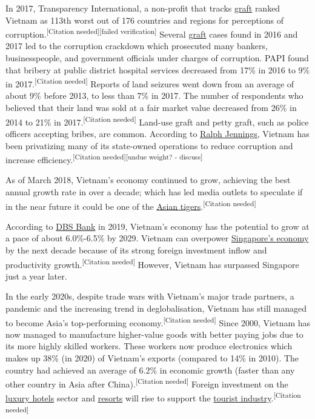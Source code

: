 \documentclass[openany]{book}
\begin{document}
In 2017, Transparency International, a non-profit that tracks \href{https://en.wikipedia.org/wiki/Graft_(politics)}{graft} ranked Vietnam as 113th worst out of 176 countries and regions for perceptions of corruption.\textsuperscript{[Citation needed][failed verification]} Several \href{https://en.wikipedia.org/wiki/Graft_(politics)}{graft} cases found in 2016 and 2017 led to the corruption crackdown which prosecuted many bankers, businesspeople, and government officials under charges of corruption. PAPI found that bribery at public district hospital services decreased from 17\% in 2016 to 9\% in 2017.\textsuperscript{[Citation needed]} Reports of land seizures went down from an average of about 9\% before 2013, to less than 7\% in 2017. The number of respondents who believed that their land was sold at a fair market value decreased from 26\% in 2014 to 21\% in 2017.\textsuperscript{[Citation needed]} Land-use graft and petty graft, such as police officers accepting bribes, are common. According to \href{https://en.wikipedia.org/wiki/Ralph_Jennings}{Ralph Jennings}, Vietnam has been privatizing many of its state-owned operations to reduce corruption and increase efficiency.\textsuperscript{[Citation needed][undue weight? - discuss]}

As of March 2018, Vietnam's economy continued to grow, achieving the best annual growth rate in over a decade; which has led media outlets to speculate if in the near future it could be one of the \href{https://en.wikipedia.org/wiki/Four_Asian_Tigers}{Asian tigers}.\textsuperscript{[Citation needed]}

According to \href{https://en.wikipedia.org/wiki/DBS_Bank}{DBS Bank} in 2019, Vietnam's economy has the potential to grow at a pace of about 6.0\%-6.5\% by 2029. Vietnam can overpower \href{https://en.wikipedia.org/wiki/Economy_of_Singapore}{Singapore's economy} by the next decade because of its strong foreign investment inflow and productivity growth.\textsuperscript{[Citation needed]} However, Vietnam has surpassed Singapore just a year later.

In the early 2020s, despite trade wars with Vietnam's major trade partners, a pandemic and the increasing trend in deglobalisation, Vietnam has still managed to become Asia's top-performing economy.\textsuperscript{[Citation needed]} Since 2000, Vietnam has now managed to manufacture higher-value goods with better paying jobs due to its more highly skilled workers. These workers now produce electronics which makes up 38\% (in 2020) of Vietnam's exports (compared to 14\% in 2010). The country had achieved an average of 6.2\% in economic growth (faster than any other country in Asia after China).\textsuperscript{[Citation needed]} Foreign investment on the \href{https://en.wikipedia.org/wiki/Luxury_hotel}{luxury hotels} sector and \href{https://en.wikipedia.org/wiki/Resorts}{resorts} will rise to support the \href{https://en.wikipedia.org/wiki/Tourist_industry}{tourist industry}.\textsuperscript{[Citation needed]}
\end{document}
